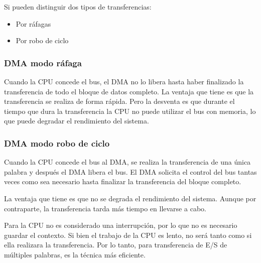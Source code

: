 Si pueden distinguir dos tipos de transferencias:

\begin{itemize}
  \item Por ráfagas
  \item Por robo de ciclo
\end{itemize}

\begin{subs}
  \subsubsection{DMA modo ráfaga}

  Cuando la CPU concede el bus, el DMA no lo libera hasta haber finalizado la transferencia de todo el bloque de datos completo. La ventaja que tiene es que la transferencia se realiza de forma rápida. Pero la desventa es que durante el tiempo que dura la transferencia la CPU no puede utilizar el bus con memoria, lo que puede degradar el rendimiento del sistema.

  \subsubsection{DMA modo robo de ciclo}

  Cuando la CPU concede el bus al DMA, se realiza la transferencia de una única palabra y después el DMA libera el bus. El DMA solicita el control del bus tantas veces como sea necesario hasta finalizar la transferencia del bloque completo.

  La ventaja que tiene es que no se degrada el rendimiento del sistema. Aunque por contraparte, la transferencia tarda más tiempo en llevarse a cabo.

  Para la CPU no es considerado una interrupción, por lo que no es necesario guardar el contexto. Si bien el trabajo de la CPU es lento, no será tanto como si ella realizara la transferencia. Por lo tanto, para transferencia de E/S de múltiples palabras, es la técnica más eficiente.

\end{subs}
